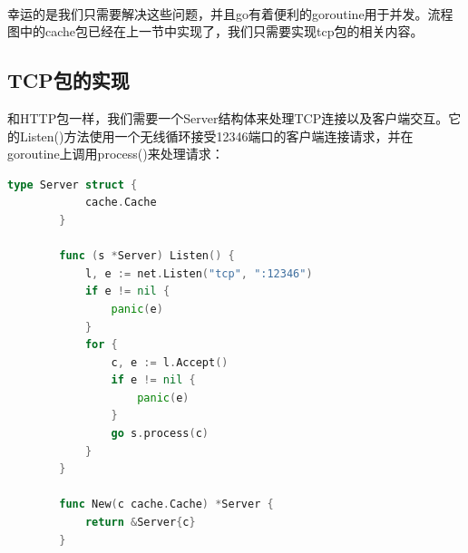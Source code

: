 \documentclass{article}
\begin{document}
	\paragraph{}
	幸运的是我们只需要解决这些问题，并且go有着便利的goroutine用于并发。流程图中的cache包已经在上一节中实现了，我们只需要实现tcp包的相关内容。
	\subsection{TCP包的实现}
	和HTTP包一样，我们需要一个Server结构体来处理TCP连接以及客户端交互。它的Listen()方法使用一个无线循环接受12346端口的客户端连接请求，并在goroutine上调用process()来处理请求：
	\begin{lstlisting}[language=Go]
		type Server struct {
			cache.Cache
		}
		
		func (s *Server) Listen() {
			l, e := net.Listen("tcp", ":12346")
			if e != nil {
				panic(e)
			}
			for {
				c, e := l.Accept()
				if e != nil {
					panic(e)
				}
				go s.process(c)
			}
		}
		
		func New(c cache.Cache) *Server {
			return &Server{c}
		}
	\end{lstlisting}
\end{document}
